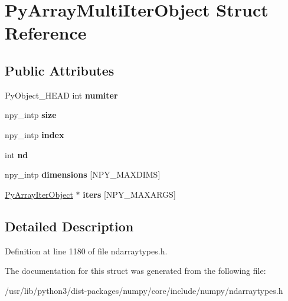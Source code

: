 \hypertarget{structPyArrayMultiIterObject}{}\section{Py\+Array\+Multi\+Iter\+Object Struct Reference}
\label{structPyArrayMultiIterObject}
\subsection*{Public Attributes}
\begin{DoxyCompactItemize}
\item 
Py\+Object\+\_\+\+H\+E\+AD int {\bfseries numiter}\hypertarget{structPyArrayMultiIterObject_a936318911a75d975b1cd15d494229ba3}{}\label{structPyArrayMultiIterObject_a936318911a75d975b1cd15d494229ba3}

\item 
npy\+\_\+intp {\bfseries size}\hypertarget{structPyArrayMultiIterObject_a9ad3ab17355bcd13c90fadaab1a21c8b}{}\label{structPyArrayMultiIterObject_a9ad3ab17355bcd13c90fadaab1a21c8b}

\item 
npy\+\_\+intp {\bfseries index}\hypertarget{structPyArrayMultiIterObject_a37883aa22d39100613d9bdaba7175da4}{}\label{structPyArrayMultiIterObject_a37883aa22d39100613d9bdaba7175da4}

\item 
int {\bfseries nd}\hypertarget{structPyArrayMultiIterObject_af68cc4321b0df114616f679b9b67c43a}{}\label{structPyArrayMultiIterObject_af68cc4321b0df114616f679b9b67c43a}

\item 
npy\+\_\+intp {\bfseries dimensions} \mbox{[}N\+P\+Y\+\_\+\+M\+A\+X\+D\+I\+MS\mbox{]}\hypertarget{structPyArrayMultiIterObject_a76bc85e50e58661f89c2579a0a5cea24}{}\label{structPyArrayMultiIterObject_a76bc85e50e58661f89c2579a0a5cea24}

\item 
\hyperlink{structPyArrayIterObject__tag}{Py\+Array\+Iter\+Object} $\ast$ {\bfseries iters} \mbox{[}N\+P\+Y\+\_\+\+M\+A\+X\+A\+R\+GS\mbox{]}\hypertarget{structPyArrayMultiIterObject_afa29cce8216964ed9682658149705bb9}{}\label{structPyArrayMultiIterObject_afa29cce8216964ed9682658149705bb9}

\end{DoxyCompactItemize}


\subsection{Detailed Description}


Definition at line 1180 of file ndarraytypes.\+h.



The documentation for this struct was generated from the following file\+:\begin{DoxyCompactItemize}
\item 
/usr/lib/python3/dist-\/packages/numpy/core/include/numpy/ndarraytypes.\+h\end{DoxyCompactItemize}

